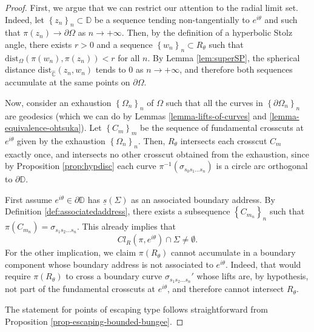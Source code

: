 \documentclass[10pt,a4paper]{amsart}
\def\Chat{\widehat{\mathbb{C}}}
\def\DD{\mathbb{D}}
\begin{document}
\begin{proof}
	First, we argue that we can restrict our attention to the radial limit set. Indeed, let $\left\lbrace z_n\right\rbrace _n\subset\DD$ be a sequence tending non-tangentially to $e^{i\theta}$ and such that $\pi(z_n)\to\partial\Omega$ as $n\to+\infty$. Then, by the definition of a hyperbolic Stolz angle, there exists $r > 0$ and a sequence $\left\lbrace w_n\right\rbrace _n\subset R_\theta$ such that $\textrm{dist}_\Omega(\pi(w_n), \pi(z_n)) < r$ for all $n$. By Lemma \ref{lem:superSP}, the spherical distance $\textrm{dist}_{\Chat}(z_n, w_n)$ tends to $ 0$ as $n\to+\infty$, and therefore both sequences accumulate at the same points on $ \partial\Omega $.

	Now, consider an exhaustion $ \left\lbrace \Omega_n\right\rbrace _n $ of $ \Omega $ such that all the curves in $ \left\lbrace \partial\Omega_n\right\rbrace _n $ are geodesics (which we can do by Lemmas \ref{lemma-lifts-of-curves} and \ref{lemma-equivalence-ohtsuka}). Let $ \left\lbrace C_m\right\rbrace _m $ be the sequence of fundamental crosscuts at $ e^{i\theta} $ given by the exhaustion  $ \left\lbrace \Omega_n\right\rbrace _n $. Then, $ R_\theta $ intersects each crosscut $ C_m $ exactly once, and intersects no other crosscut obtained from the exhaustion, since by Proposition \ref{prop:hypdisc} each curve $\pi^{-1}(\sigma_{s_0s_1\dots s_n})$ is a circle arc orthogonal to $\partial\DD$. 
	
	First assume $ e^{i\theta} \in\partial\mathbb{D}$ has $ \underline{s} (\Sigma)$ as an associated boundary address. By Definition \ref{def:associatedaddress}, there exists a subsequence $ \left\lbrace C_{m_n}\right\rbrace _n $ such that $ \pi(C_{m_n})=\sigma_{s_1s_2\dots s_n} $. This already implies that \[ Cl_R(\pi, e^{i\theta})\cap\Sigma \neq\emptyset.\] For the other implication, we claim $ \pi (R_\theta ) $ cannot accumulate in a boundary component whose boundary address is not associated to $ e^{i\theta} $. Indeed, that would require $\pi(R_\theta)$ to cross a boundary curve $\sigma_{s_1s_2\dots s_n}'$ whose lifts are, by hypothesis, not part of the fundamental crosscuts at $e^{i\theta}$, and therefore cannot intersect $R_\theta$.
	
	The statement for points of escaping type follows straightforward from Proposition \ref{prop-escaping-bounded-bungee}. 


\end{proof}
\end{document}
